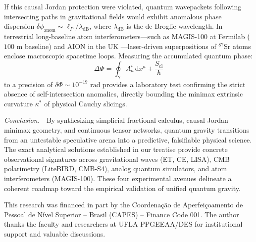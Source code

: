 \documentclass[aps,prl,reprint,twocolumn,superscriptaddress,nofootinbib,floatfix]{revtex4-2}
\newcommand{\dif}{\,\mathrm{d}}
\begin{document}
If this causal Jordan protection were violated, quantum wavepackets following intersecting paths in gravitational fields would exhibit anomalous phase dispersion $\delta \phi_{\mathrm{anom}} \sim \ell_P / \lambda_{\mathrm{dB}}$, where $\lambda_{\mathrm{dB}}$ is the de Broglie wavelength. In terrestrial long-baseline atom interferometers—such as MAGIS-100 at Fermilab ($100\text{ m}$ baseline) \cite{abe2021matter} and AION in the UK \cite{badurina2020aion}—laser-driven superpositions of $^{87}\mathrm{Sr}$ atoms enclose macroscopic spacetime loops. Measuring the accumulated quantum phase:
\begin{equation}
    \Delta \Phi = \oint_\gamma A_a^i \dif x^a + \frac{S_{\mathrm{cl}}}{\hbar}
\end{equation}
to a precision of $\delta \Phi \sim 10^{-19}\text{ rad}$ provides a laboratory test confirming the strict absence of self-intersection anomalies, directly bounding the minimax extrinsic curvature $\kappa^*$ of physical Cauchy slicings.

\emph{Conclusion.}---By synthesizing simplicial fractional calculus, causal Jordan minimax geometry, and continuous tensor networks, quantum gravity transitions from an untestable speculative arena into a predictive, falsifiable physical science. The exact analytical solutions established in our treatise provide concrete observational signatures across gravitational waves (ET, CE, LISA), CMB polarimetry (LiteBIRD, CMB-S4), analog quantum simulators, and atom interferometers (MAGIS-100). These four experimental avenues delineate a coherent roadmap toward the empirical validation of unified quantum gravity.

\begin{acknowledgments}
This research was financed in part by the Coordena\c{c}\~ao de Aperfei\c{c}oamento de Pessoal de N\'ivel Superior -- Brasil (CAPES) -- Finance Code 001. The author thanks the faculty and researchers at UFLA PPGEEAA/DES for institutional support and valuable discussions.
\end{acknowledgments}
\end{document}
